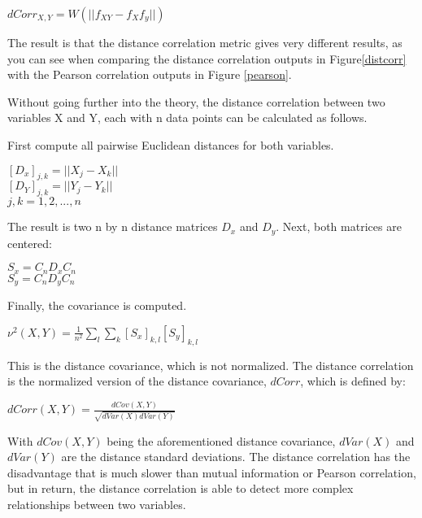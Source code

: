 \begin{center}
$dCorr_{X,Y} = W( || f_{XY} - f_Xf_y|| )$
\end{center}

The result is that the distance correlation metric gives very different results, as you can see when comparing the distance correlation outputs in Figure\ref{distcorr} with the Pearson correlation outputs in Figure \ref{pearson}.


Without going further into the theory, the distance correlation between two variables X and Y, each with n data points can be calculated as 
follows. 

\npar

First compute all pairwise Euclidean distances for both variables.
\begin{center}
$[D_x]_{j,k} = || X_j - X_k||$ \\
$[D_Y]_{j,k} = || Y_j - Y_k||$ \\
$j,k = 1,2,...,n$\\
\end{center}
The result is two n by n distance matrices $D_x$ and $D_y$. Next, both matrices are centered:
\begin{center}
$S_x = C_nD_xC_n$\\
$S_y = C_nD_yC_n$\\
\end{center}
Finally, the covariance is computed.
\begin{center}
$\nu^2(X,Y) = \frac{1}{n^2} \sum\limits_l \sum\limits_k [S_x]_{k,l}[S_y]_{k,l}$ 
\end{center}

This is the distance covariance, which is not normalized. The distance correlation is the normalized version of the distance covariance, $dCorr$, which is defined by:

\begin{center}
$dCorr(X,Y) = \frac{dCov(X,Y)}{\sqrt{dVar(X)dVar(Y)}}$
\end{center}
With $dCov(X,Y)$ being the aforementioned distance covariance, $dVar(X)$ and $dVar(Y)$ are the distance standard deviations. The distance correlation has the disadvantage that is much slower than mutual information or Pearson correlation, but in return, the distance correlation is able to detect more complex relationships between two variables.

